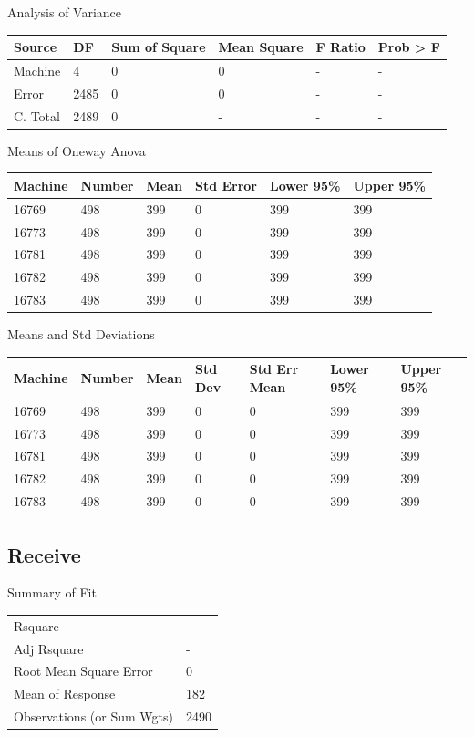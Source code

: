 \documentclass[12pt,twocolumn]{report}
\begin{document}
Analysis of Variance
\newline
\begin{tabular}{l | l | l | l | l | l}
Source&DF&Sum of Square&Mean Square&F Ratio&Prob > F \\
\hline
Machine&4&0&0&-&- \\
Error&2485&0&0&-&- \\
C. Total&2489&0&-&-&- \\
\end{tabular}
\newline

Means of Oneway Anova
\newline
\begin{tabular}{l | l | l | l | l | l}
Machine&Number&Mean&Std Error&Lower 95\%&Upper 95\% \\
\hline
16769&498&399&0&399&399 \\
16773&498&399&0&399&399 \\
16781&498&399&0&399&399 \\
16782&498&399&0&399&399 \\
16783&498&399&0&399&399 \\
\end{tabular}
\newline

Means and Std Deviations
\newline
\begin{tabular}{l | l | l | l | l | l | l}
Machine&Number&Mean&Std Dev&Std Err Mean&Lower 95\%&Upper 95\% \\
\hline
16769&498&399&0&0&399&399 \\
16773&498&399&0&0&399&399 \\
16781&498&399&0&0&399&399 \\
16782&498&399&0&0&399&399 \\
16783&498&399&0&0&399&399 \\
\end{tabular}
\newline

\subsection{Receive}
Summary of Fit
\newline
\begin{tabular}{l | l}
  Rsquare&- \\
  Adj Rsquare&- \\
  Root Mean Square Error&0 \\
  Mean of Response&182 \\
  Observations (or Sum Wgts)&2490 \\
\end{tabular}
\newline
\end{document}
